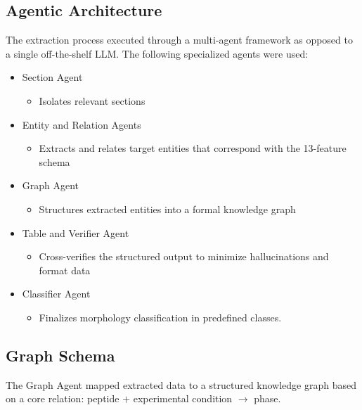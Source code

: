 \subsection{Agentic Architecture}
The extraction process executed through a multi-agent framework as opposed to a single off-the-shelf LLM. The following specialized agents were used: 
\begin{itemize}
    \item Section Agent
    \begin{itemize}
        \item Isolates relevant sections
    \end{itemize}
    \item Entity and Relation Agents
    \begin{itemize}
        \item Extracts and relates target entities that correspond with the 13-feature schema
    \end{itemize}
    \item Graph Agent
    \begin{itemize}
        \item Structures extracted entities into a formal knowledge graph
    \end{itemize}
    \item Table and Verifier Agent
    \begin{itemize}
        \item Cross-verifies the structured output to minimize hallucinations and format data
    \end{itemize}
    \item Classifier Agent
    \begin{itemize}
        \item Finalizes morphology classification in predefined classes.
    \end{itemize}
\end{itemize}

\subsection{Graph Schema}
The Graph Agent mapped extracted data to a structured knowledge graph based on a core relation: peptide $+$ experimental condition $\rightarrow$ phase.

